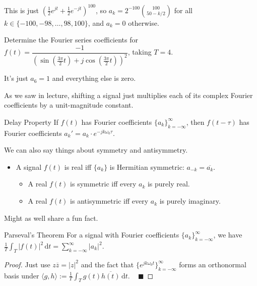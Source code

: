 \begin{solution}
    This is just $\left(\frac{1}{2} e^{jt} + \frac{1}{2}e^{-jt}\right)^{100}$,
    so $a_k = 2^{-100} \binom{100}{50 - k / 2}$ for all $k \in \{-100, -98, \dots, 98, 100\}$,
    and $a_k = 0$ otherwise.
\end{solution}

\begin{problem}
    Determine the Fourier series coefficients for
    $f(t) = \dfrac{-1}{\left(\sin\left(\frac{3\pi}{2}t\right) + j\cos\left(\frac{3\pi}{2}t\right)\right)^2}$,
    taking $T = 4$.
\end{problem}

\begin{solution}
    It's just $a_6 = 1$ and everything else is zero.
\end{solution}

As we saw in lecture, shifting a signal just multiplies
each of its complex Fourier coefficients by a unit-magnitude constant.

\begin{theorem}{Delay Property}
    If $f(t)$ has Fourier coefficients $\{a_k\}_{k = -\infty}^{\infty}$, then
    $f(t - \tau)$ has Fourier coefficients $a_k' = a_k \cdot e^{-jk\omega_0 \tau}$.
\end{theorem}

We can also say things about symmetry and antisymmetry.
\begin{itemize}
    \item A signal $f(t)$ is real iff $\{a_k\}$ is Hermitian symmetric: $a_{-k} = \overline{a_k}$.
    \begin{itemize}
        \item A real $f(t)$ is symmetric iff every $a_k$ is purely real.
        \item A real $f(t)$ is antisymmetric iff every $a_k$ is purely imaginary.
    \end{itemize}
\end{itemize}

Might as well share a fun fact.

\begin{theorem}{Parseval's Theorem}
    For a signal with Fourier coefficients $\{a_k\}_{k = -\infty}^{\infty}$,
    we have $\frac{1}{T} \int_T |f(t)|^2 \, \mathrm{d}t = \sum_{k = -\infty}^{\infty} |a_k|^2$.
\end{theorem}

\begin{proof}
    Just use $z \overline{z} = |z|^2$ and the fact that
    $\{e^{jk \omega_0 t}\}_{k = -\infty}^{\infty}$ forms an orthonormal basis
    under $\langle g, h \rangle := \frac{1}{T} \int_T g(t) \overline{h(t)} \, \mathrm{d}t$. ~ $\blacksquare$
\end{proof}

